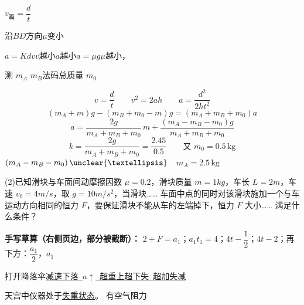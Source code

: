 
$v_{\text{瞬}}=\dfrac{d}{t}$

沿$BD$方向$\mu$变小

$a=Kdv$\quad $v$越小$a$越小\quad $a=\mu g$\quad $\mu$越小，
\begin{problem}
测 $m_A$ $m_B$\quad 法码总质量 $m_0$ %



\begin{solution}
\[ v=\frac{d}{t}\qquad v^2=2ah\qquad a=\frac{d^2}{2ht^2} \]
\[ (m_A+m)g-(m_B+m_0-m)g=(m_A+m_B+m_0)a \]
\[ a=\frac{2g}{m_A+m_B+m_0}\,m+\frac{(m_A-m_B-m_0)g}{m_A+m_B+m_0} \]
\[ k=\frac{2g}{m_A+m_B+m_0}=\frac{2.45}{0.5}\qquad\text{又 }m_0=0.5\,\mathrm{kg} \]
$(m_A-m_B-m_0)\,\unclear{…}$\ \ $m_A=2.5\,\mathrm{kg}$
\end{solution}
\end{problem}
\begin{problem}[粘贴印刷题·第(2)问]
(2)已知滑块与车面间动摩擦因数 $\mu=0.2$，滑块质量 $m=1\unit{kg}$，车长 $L=2\unit{m}$，车速 $v_0=4\unit{m/s}$，取 $g=10\unit{m/s^2}$，当滑块……%
车面中点的同时对该滑块施加一个与车运动方向相同的恒力 $F$，要保证滑块不能从车的左端掉下，恒力 $F$ 大小……%
满足什么条件？

\medskip
\noindent\textbf{手写草算（右侧页边，部分被截断）：}
$2+F=a_1$；\quad $a_1t_1=4$；\quad $4t-\dfrac12$；\quad $4t-2$；\quad 再下方：$\dfrac{a_1}{2}$，$a_1$%
\end{problem}
打开降落伞\underline{减速下落\ $a\uparrow$\ 超重}\qquad \underline{上超下失\ 超加失减}

天宫中仪器处于\underline{失重状态}。
有空气阻力

